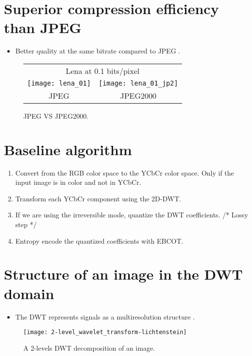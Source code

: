 \section{Superior compression efficiency than \gls{JPEG}}
\begin{itemize}
\item Better quality at the same bitrate compared to JPEG \cite{vruiz_J2K}.
\end{itemize}

\begin{figure}[H]
  \vspace{-2ex}
  \centering
  \begin{tabular}{cc}
    \multicolumn{2}{c}{Lena at 0.1 bits/pixel} \\
    \texttt{[image: lena\_01]} & \texttt{[image: lena\_01\_jp2]} \\
    JPEG & JPEG2000
  \end{tabular}
  \caption{\gls{JPEG} VS JPEG2000.}
  \label{fig:J2K_JPEG}
\end{figure}

\section{Baseline algorithm}
\begin{enumerate}
\item Convert from the \gls{RGB} color space to the \gls{YCbCr} color
  space. Only if the input image is in color and not in \gls{YCbCr}.
\item Transform each \gls{YCbCr} component using the 2D-\gls{DWT}.
\item If we are using the irreversible mode, quantize the \gls{DWT}
  coefficients. /* Lossy step */
\item Entropy encode the quantized coefficients with \gls{EBCOT}.
\end{enumerate}

\section{Structure of an image in the DWT domain}
\begin{itemize}
\item The \gls{DWT} represents signals as a multiresolution structure
  \cite{vruiz_J2K}.
\end{itemize}

\begin{figure}[H]
  \vspace{-2ex}
  \centering
  \texttt{[image: 2-level\_wavelet\_transform-lichtenstein]}
  \caption{A 2-levels \gls{DWT} decomposition of an image.}
  \label{fig:J2K_DWT}
\end{figure}

